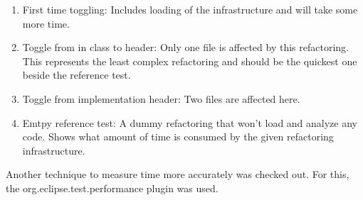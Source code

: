 \begin{enumerate}
\item First time toggling: Includes loading of the infrastructure and will take 
some more time.
\item Toggle from in class to header: Only one file is affected by this 
refactoring. This represents the least complex refactoring and should be the 
quickest one beside the reference test.
\item Toggle from implementation header: Two files are affected here.
\item Emtpy reference test: A dummy refactoring that won't load and analyze any 
code. Shows what amount of time is consumed by the given refactoring 
infrastructure.
\end{enumerate}

Another technique to measure time more accurately was checked out. For this, the 
org.eclipse.test.performance plugin was used. 


